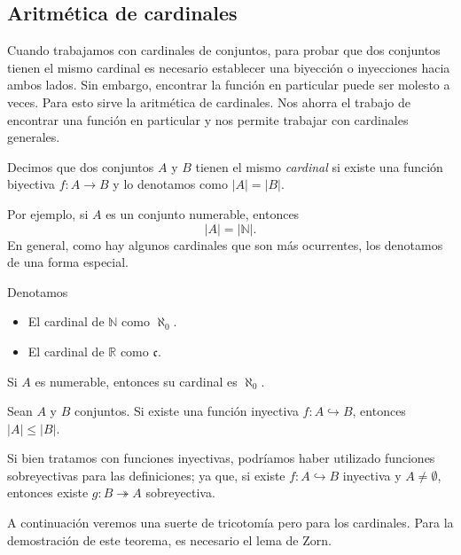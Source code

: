 \subsection{Aritmética de cardinales}

Cuando trabajamos con cardinales de conjuntos, para probar que dos conjuntos tienen el mismo cardinal es necesario establecer una biyección o inyecciones hacia ambos lados. Sin embargo, encontrar la función en particular puede ser molesto a veces. Para esto sirve la aritmética de cardinales. Nos ahorra el trabajo de encontrar una función en particular y nos permite trabajar con cardinales generales.

\begin{definition}
    Decimos que dos conjuntos $A$ y $B$ tienen el mismo \emph{cardinal} si existe una función biyectiva $f: A \to  B$ y lo denotamos como $\lvert A \rvert = \lvert B \rvert$.
\end{definition}

Por ejemplo, si $A$ es un conjunto numerable, entonces
$$
    \lvert A \rvert = \lvert \mathbb{N} \rvert.
$$
En general, como hay algunos cardinales que son más ocurrentes, los denotamos de una forma especial.

\begin{definition}
    Denotamos
    \begin{itemize}
        \item El cardinal de $\mathbb{N}$ como $\aleph_0$.
        \item El cardinal de $\mathbb{R}$ como $\mathfrak{c}$.
    \end{itemize}
\end{definition}

\begin{remark}
    Si $A$ es numerable, entonces su cardinal es $\aleph_0$.
\end{remark}

\begin{definition}
    Sean $A$ y $B$ conjuntos. Si existe una función inyectiva $f: A \hookrightarrow B$, entonces $\lvert A \rvert \leq \lvert B \rvert$.
\end{definition}

Si bien tratamos con funciones inyectivas, podríamos haber utilizado funciones sobreyectivas para las definiciones; ya que, si existe $f: A \hookrightarrow B$ inyectiva y $A \neq \emptyset $, entonces existe $g: B \twoheadrightarrow A$ sobreyectiva.

A continuación veremos una suerte de tricotomía pero para los cardinales. Para la demostración de este teorema, es necesario el lema de Zorn. 

